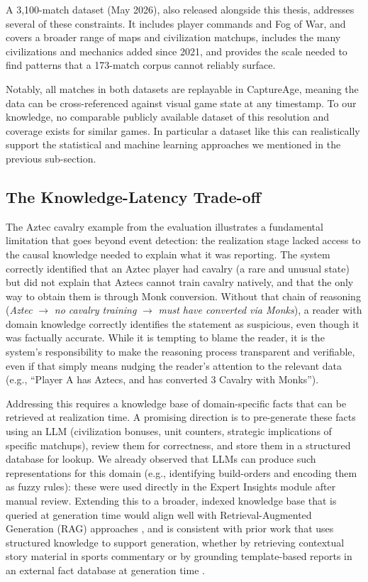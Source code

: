 A 3,100-match dataset (May 2026), also released alongside this thesis, addresses several of these constraints. It includes player commands and Fog of War, and covers a broader range of maps and civilization matchups, includes the many civilizations and mechanics added since 2021, and provides the scale needed to find patterns that a 173-match corpus cannot reliably surface.

Notably, all matches in both datasets are replayable in CaptureAge, meaning the data can be cross-referenced against visual game state at any timestamp. To our knowledge, no comparable publicly available \cite{synnaeve2017} dataset of this resolution \cite{aoe2ocel2024} and coverage exists for similar games. In particular a dataset like this can realistically support the statistical and machine learning approaches we mentioned in the previous sub-section.

\subsection{The Knowledge-Latency Trade-off}

The Aztec cavalry example from the evaluation illustrates a fundamental limitation that goes beyond event detection: the realization stage lacked access to the causal knowledge needed to explain what it was reporting. The system correctly identified that an Aztec player had cavalry (a rare and unusual state) but did not explain that Aztecs cannot train cavalry natively, and that the only way to obtain them is through Monk conversion. Without that chain of reasoning (\textit{Aztec} $\rightarrow$ \textit{no cavalry training} $\rightarrow$ \textit{must have converted via Monks}), a reader with domain knowledge correctly identifies the statement as suspicious, even though it was factually accurate. While it is tempting to blame the reader, it is the system's responsibility to make the reasoning process transparent and verifiable, even if that simply means nudging the reader's attention to the relevant data (e.g., ``Player A has Aztecs, and has converted 3 Cavalry with Monks'').

Addressing this requires a knowledge base of domain-specific facts that can be retrieved at realization time. A promising direction is to pre-generate these facts using an LLM (civilization bonuses, unit counters, strategic implications of specific matchups), review them for correctness, and store them in a structured database for lookup. We already observed that LLMs can produce such representations for this domain (e.g., identifying build-orders and encoding them as fuzzy rules): these were used directly in the Expert Insights module after manual review. Extending this to a broader, indexed knowledge base that is queried at generation time would align well with Retrieval-Augmented Generation (RAG) approaches \cite{lewis2020}, and is consistent with prior work that uses structured knowledge to support generation, whether by retrieving contextual story material in sports commentary \cite{lee2013} or by grounding template-based reports in an external fact database at generation time \cite{gatti2018}.

